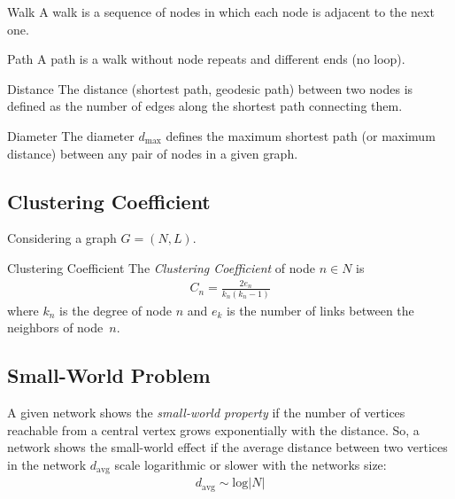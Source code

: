 \documentclass[english]{panikzettel}
\begin{document}
\begin{halfboxl}
	\begin{defi}{Walk}
		A walk is a sequence of nodes in which each node is adjacent to the next one.
	\end{defi}
\end{halfboxl}
\begin{halfboxr}
	\begin{defi}{Path}
		A path is a walk without node repeats and different ends (no loop).
	\end{defi}
\end{halfboxr}

\begin{halfboxl}
	\begin{defi}{Distance}
		The distance (shortest path, geodesic path) between two nodes is defined as the number of edges along the shortest path connecting them.
	\end{defi}
\end{halfboxl}
\begin{halfboxr}
	\begin{defi}{Diameter}
		The diameter $ d_\text{max} $ defines the maximum shortest path (or maximum distance) between any pair of nodes in a given graph.
	\end{defi}
\end{halfboxr}

\subsection{Clustering Coefficient} \label{sec:clustering_coefficient}
Considering a graph $ G = (N,L) $.

\begin{defi}{Clustering Coefficient}
	The \textit{Clustering Coefficient} of node $ n \in N $ is
	\begin{align*}
		C_n = \frac{2 e_n}{k_n (k_n - 1)}
	\end{align*}
	where $ k_n $ is the degree of node $ n $ and $ e_k $ is the number of links between the neighbors of node~$ n $.
\end{defi}

\subsection{Small-World Problem}\label{sec:small_world_problem}
A given network shows the \textit{small-world property} if the number of vertices reachable from a central vertex grows exponentially with the distance. 
So, a network shows the small-world effect if the average distance between two vertices in the network $ d_\text{avg} $ scale logarithmic or slower with the networks size:
\begin{align*}
	d_\text{avg} \sim \text{log} |N|
\end{align*}
\end{document}
